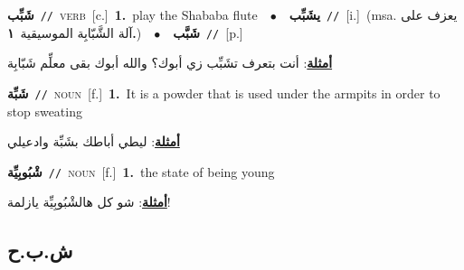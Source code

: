 \documentclass[10pt,a4paper,twoside]{article} %
\begin{document}
\begin{multicols}{2}
{{{{{{\setlength\topsep{0pt}\textbf{\foreignlanguage{arabic}{شَبِّب}}\ {\color{gray}\texttt{//}\color{black}}\ \textsc{verb}\ [c.]\ \textbf{1.}~play the Shababa flute\ \ $\bullet$\ \ \setlength\topsep{0pt}\textbf{\foreignlanguage{arabic}{يشَبِّب}}\ {\color{gray}\texttt{//}\color{black}}\ [i.]\ \color{gray}(msa. \foreignlanguage{arabic}{يعزف على آلة الشَّبّابِة الموسيقية}~\foreignlanguage{arabic}{\textbf{١.}})\color{black}\ \ $\bullet$\ \ \setlength\topsep{0pt}\textbf{\foreignlanguage{arabic}{شَبَّب}}\ {\color{gray}\texttt{//}\color{black}}\ [p.]\  \begin{flushright}\color{gray}\foreignlanguage{arabic}{\textbf{\underline{\foreignlanguage{arabic}{أمثلة}}}: أنت بتعرف تشَبِّب زي أبوك؟ والله أبوك بقى معلِّم شَبّابِة}\end{flushright}\color{black}} \vspace{2mm}

{\setlength\topsep{0pt}\textbf{\foreignlanguage{arabic}{شَبِّة}}\ {\color{gray}\texttt{//}\color{black}}\ \textsc{noun}\ [f.]\ \textbf{1.}~It is a powder that is used under the armpits in order to stop sweating\  \begin{flushright}\color{gray}\foreignlanguage{arabic}{\textbf{\underline{\foreignlanguage{arabic}{أمثلة}}}: ليطي أباطك بشَبِّة وادعيلي}\end{flushright}\color{black}} \vspace{2mm}

{\setlength\topsep{0pt}\textbf{\foreignlanguage{arabic}{شْبُوبِيِّة}}\ {\color{gray}\texttt{//}\color{black}}\ \textsc{noun}\ [f.]\ \textbf{1.}~the state of being young\  \begin{flushright}\color{gray}\foreignlanguage{arabic}{\textbf{\underline{\foreignlanguage{arabic}{أمثلة}}}: شو كل هالشْبُوبِيِّة يازلمة!}\end{flushright}\color{black}} \vspace{2mm}

\vspace{-3mm}
\subsection*{\color{blue}\foreignlanguage{arabic}{ش.ب.ح}\color{blue}{}} 

}}}}}
\end{multicols}
\end{document}
